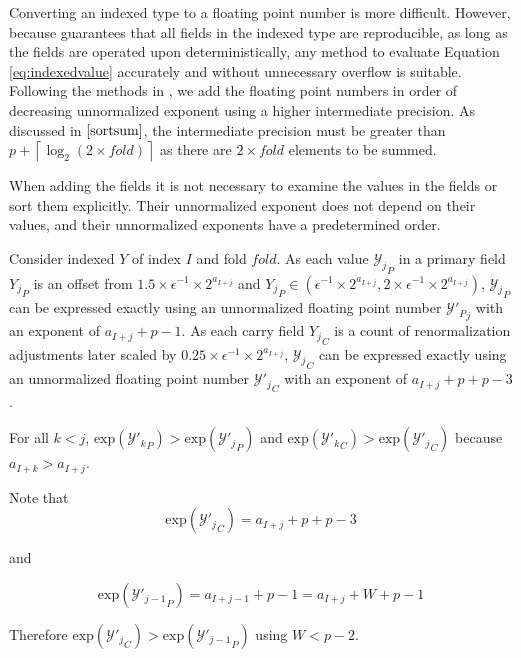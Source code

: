 \documentclass[12pt]{article}
\providecommand{\ceil}[1]{\left \lceil #1 \right \rceil }
\providecommand{\exp}{\ensuremath{\text{exp}}}
\theoremstyle{plain}
\numberwithin{equation}{section}
\begin{document}
    Converting an indexed type to a floating point number is more difficult. However, because \cite{repsum} guarantees that all fields in the indexed type are reproducible, as long as the fields are operated upon deterministically, any method to evaluate Equation \ref{eq:indexedvalue} accurately and without unnecessary overflow is suitable. Following the methods in \cite{sortsum}, we add the floating point numbers in order of decreasing unnormalized exponent using a higher intermediate precision. As discussed in $\cite{sortsum}$, the intermediate precision must be greater than $p + \ceil{\log_2(2 \times fold)}$ as there are $2 \times fold$ elements to be summed.

    When adding the fields it is not necessary to examine the values in the fields or sort them explicitly. Their unnormalized exponent does not depend on their values, and their unnormalized exponents have a predetermined order.

    Consider indexed $Y$ of index $I$ and fold $fold$.
    As each value ${\mathcal{Y}_j}_P$ in a primary field ${Y_j}_P$ is an offset from $1.5 \times \epsilon^{-1} \times 2^{a_{I + j}}$ and ${Y_j}_P \in (\epsilon^{-1} \times 2^{a_{I + j}}, 2 \times \epsilon^{-1} \times 2^{a_{I + j}})$, ${\mathcal{Y}_j}_P$ can be expressed exactly using an unnormalized floating point number ${\mathcal{Y}'_P}_j$ with an exponent of $a_{I + j} + p - 1$.
    As each carry field ${Y_j}_C$ is a count of renormalization adjustments later scaled by $0.25 \times \epsilon^{-1} \times 2^{a_{I + j}}$, ${\mathcal{Y}_j}_C$ can be expressed exactly using an unnormalized floating point number ${\mathcal{Y}'_j}_C$ with an exponent of $a_{I + j} + p + p - 3$.

    For all $k < j$, $\exp({\mathcal{Y}'_k}_P) > \exp({\mathcal{Y}'_j}_P)$ and $\exp({\mathcal{Y}'_k}_C) > \exp({\mathcal{Y}'_j}_C)$ because $a_{I + k} > a_{I + j}$.

    Note that
    \begin{equation*}
      \exp({\mathcal{Y}'_j}_C) = a_{I + j} + p + p - 3
    \end{equation*}

    and

    \begin{equation*}
      \exp({\mathcal{Y}'_{j - 1}}_P) = a_{I + j - 1} + p - 1 = a_{I + j} + W + p - 1
    \end{equation*}

    Therefore $\exp({\mathcal{Y}'_j}_C) > \exp({\mathcal{Y}'_{j - 1}}_P)$ using $W < p - 2$.
\end{document}

